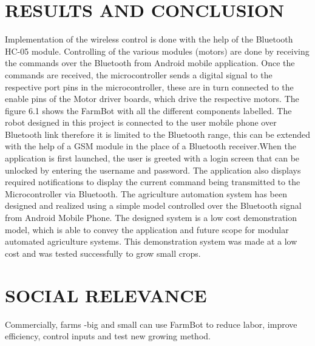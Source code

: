 \documentclass[12pt,a4paper]{report}
\begin{document}
\chapter{{RESULTS AND CONCLUSION}}
\hspace*{1cm} Implementation of the wireless control is done with the help of the Bluetooth HC-05 module. Controlling of the various modules (motors) are done by receiving the commands over the Bluetooth from Android mobile application. Once the commands are received, the microcontroller sends a digital signal to the respective port pins in the microcontroller, these are in turn connected to the enable pins of  the Motor driver boards, which drive the respective motors. The figure 6.1 shows the FarmBot with all the different components labelled. The robot designed in this project is connected to the user mobile phone over Bluetooth link therefore it is limited to the Bluetooth range, this can be extended with the help of a GSM module in the place of a Bluetooth receiver.When the application is first launched, the user is greeted with a login screen that can be unlocked by entering the username and password. The application also displays required notifications to display the current command being transmitted to the Microcontroller via Bluetooth. The agriculture automation system has been designed and realized using a simple model controlled over the Bluetooth signal from Android Mobile Phone. The designed system is a low cost demonstration model, which is able to convey the application and future scope for modular automated agriculture systems. This demonstration system was made at a low cost and was tested successfully to grow small crops.
\chapter {SOCIAL RELEVANCE}
\hspace*{1cm}Commercially, farms -big and small can use FarmBot to reduce labor, improve efficiency, control inputs and test new growing method. \\\
\end{document}
